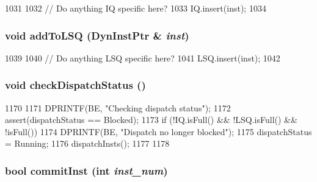 \begin{DoxyCode}
1031 {
1032     // Do anything IQ specific here?
1033     IQ.insert(inst);
1034 }
\end{DoxyCode}
\hypertarget{classBackEnd_a1b9c2184abc4f4e7a00285130f39bf26}{
\subsubsection[{addToLSQ}]{\setlength{\rightskip}{0pt plus 5cm}void addToLSQ ({\bf DynInstPtr} \& {\em inst})}}
\label{classBackEnd_a1b9c2184abc4f4e7a00285130f39bf26}



\begin{DoxyCode}
1039 {
1040     // Do anything LSQ specific here?
1041     LSQ.insert(inst);
1042 }
\end{DoxyCode}
\hypertarget{classBackEnd_aee5c9997a61eb30564062dcdbda8c246}{
\subsubsection[{checkDispatchStatus}]{\setlength{\rightskip}{0pt plus 5cm}void checkDispatchStatus ()}}
\label{classBackEnd_aee5c9997a61eb30564062dcdbda8c246}



\begin{DoxyCode}
1170 {
1171     DPRINTF(BE, "Checking dispatch status\n");
1172     assert(dispatchStatus == Blocked);
1173     if (!IQ.isFull() && !LSQ.isFull() && !isFull()) {
1174         DPRINTF(BE, "Dispatch no longer blocked\n");
1175         dispatchStatus = Running;
1176         dispatchInsts();
1177     }
1178 }
\end{DoxyCode}
\hypertarget{classBackEnd_a300f33ed45badc3c856983b1b7469955}{
\subsubsection[{commitInst}]{\setlength{\rightskip}{0pt plus 5cm}bool commitInst (int {\em inst\_\-num})}}
\label{classBackEnd_a300f33ed45badc3c856983b1b7469955}



